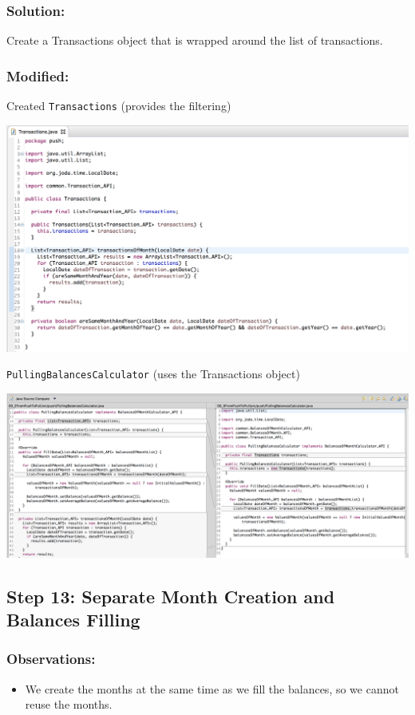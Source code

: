 \documentclass[a4paper,fleqn,titlepage,11pt]{article}
\begin{document}
\subsubsection*{Solution:}

Create a Transactions object that is wrapped around the list of transactions.

\subsubsection*{Modified:}

Created \texttt{Transactions} (provides the filtering)

\includegraphics[width=1\textwidth]{CompareViews/12-1.png}

\texttt{PullingBalancesCalculator} (uses the Transactions object)

\includegraphics[width=1\textwidth]{CompareViews/11-12-2.png}

\subsection*{Step 13: Separate Month Creation and Balances Filling}

\subsubsection*{Observations:}
\begin{itemize}
\item We create the months at the same time as we fill the balances, so we cannot reuse the months.
\end{itemize}
\end{document}
